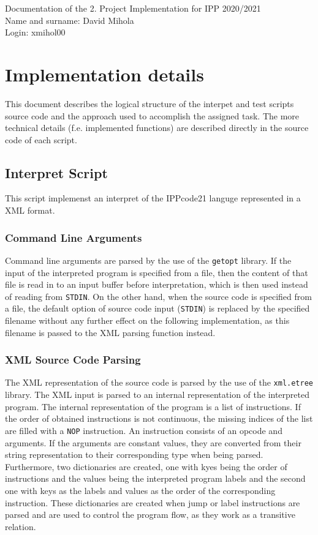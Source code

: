 \documentclass[10pt]{article}
\begin{document}
Documentation of the 2. Project Implementation for IPP 2020/2021
\\Name and surname: David Mihola
\\Login: xmihol00
\section*{Implementation details}
This document describes the logical structure of the interpet and test scripts source code and the approach used to accomplish the assigned task. The more technical details (f.e. implemented functions) are described directly in the source code of each script.

\subsection*{Interpret Script}
This script implemenst an interpret of the IPPcode21 languge represented in a XML format.

\subsubsection*{Command Line Arguments}
Command line arguments are parsed by the use of the \texttt{getopt} library. If the input of the interpreted program is specified from a file, then the content of that file is read in to an input buffer before interpretation, which is then used instead of reading from \texttt{STDIN}. On the other hand, when the source code is specified from a file, the default option of source code input (\texttt{STDIN}) is replaced by the specified filename without any further effect on the following implementation, as this filename is passed to the XML parsing function instead.

\subsubsection*{XML Source Code Parsing}
The XML representation of the source code is parsed by the use of the \texttt{xml.etree} library. The XML input is parsed to an internal representation of the interpreted program. The internal representation of the program is a list of instructions. If the order of obtained instructions is not continuous, the missing indices of the list are filled with a \texttt{NOP} instruction. An instruction consists of an opcode and arguments. If the arguments are constant values, they are converted from their string representation to their corresponding type when being parsed. Furthermore, two dictionaries are created, one with kyes being the order of instructions and the values being the interpreted program labels and the second one with keys as the labels and values as the order of the corresponding instruction. These dictionaries are created when jump or label instructions are parsed and are used to control the program flow, as they work as a transitive relation.
\end{document}
